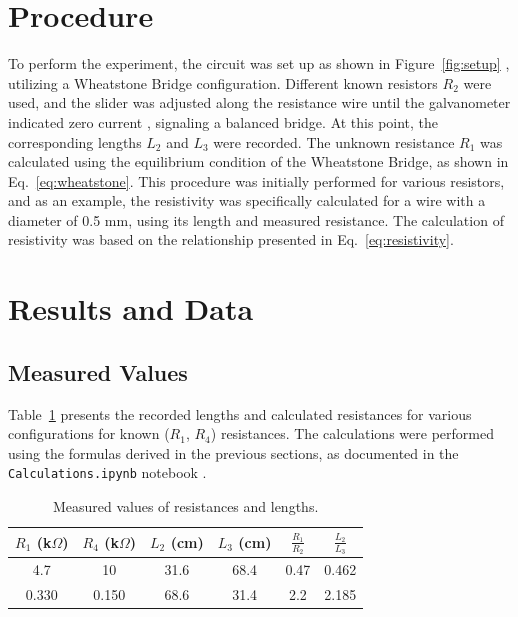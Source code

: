 \documentclass[journal]{IEEEtran}
\begin{document}
\section{Procedure}
To perform the experiment, the circuit was set up as shown in Figure~\ref{fig:setup}
, utilizing a Wheatstone Bridge configuration. 
Different known resistors \( R_2 \) were used, and the slider was adjusted 
along the resistance wire until the galvanometer indicated zero current
, signaling a balanced bridge. At this point, the corresponding lengths \( L_2 \) and \( L_3 \) were recorded. 
The unknown resistance \( R_1 \) was calculated using the equilibrium 
condition of the Wheatstone Bridge, as shown in Eq.~\ref{eq:wheatstone}. This procedure was initially performed for various resistors, and as an example, the resistivity was specifically calculated for a wire with a diameter of 0.5 mm, using its length and measured resistance. The calculation of resistivity was based on the relationship presented in Eq.~\ref{eq:resistivity}.

\section{Results and Data}

\subsection{Measured Values}
Table~\ref{tab:results} presents the recorded lengths and calculated 
resistances for various configurations for known ($R_1$, $R_4$) resistances. The calculations were performed using 
the formulas derived in the previous sections, as documented in the 
\texttt{Calculations.ipynb} notebook \cite{github}.

\begin{table}[H]
\centering
\begin{tabular}{cccccc}
\hline
$R_1$ (k$\Omega$) & $R_4$ (k$\Omega$) & $L_2$ (cm) & $L_3$ (cm) & $\frac{R_1}{R_2}$ & $\frac{L_2}{L_3}$\\
\hline
4.7 & 10 & 31.6 & 68.4 & 0.47 & 0.462 \\
0.330 & 0.150 & 68.6 & 31.4 & 2.2 & 2.185\\
\hline
\end{tabular}
\caption{Measured values of resistances and lengths.}
\label{tab:results}
\end{table}
\end{document}
